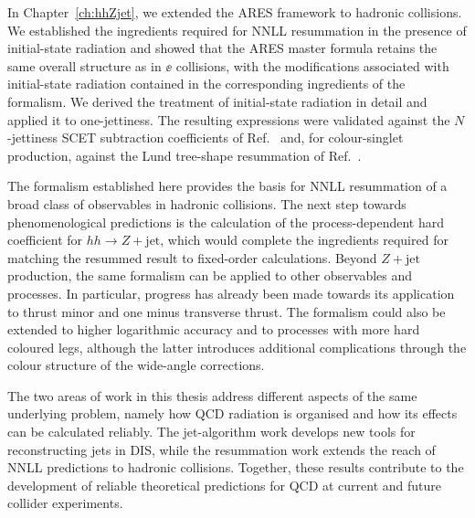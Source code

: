 In Chapter~\ref{ch:hhZjet}, we extended the \textsc{ARES}
framework to hadronic collisions. We established the ingredients required
for NNLL resummation in the presence of initial-state radiation and showed
that the \textsc{ARES} master formula retains the same overall structure
as in $\ee$ collisions, with the modifications associated with
initial-state radiation contained in the corresponding ingredients of
the formalism. We derived the treatment of initial-state radiation in detail 
and applied it to one-jettiness. The resulting expressions were validated against the 
$N$-jettiness SCET subtraction coefficients of Ref.~\cite{Gaunt:2015pea} and, for colour-singlet
production, against the Lund tree-shape resummation of Ref.~\cite{vanBeekveld:2025zjh}.

The formalism established here provides the basis for NNLL resummation of
a broad class of observables in hadronic collisions. The next step towards
phenomenological predictions is the calculation of the process-dependent
hard coefficient for $hh\to Z+\mathrm{jet}$, which would complete the
ingredients required for matching the resummed result to fixed-order
calculations. Beyond $Z+\mathrm{jet}$ production, the same formalism can be applied to
other observables and processes. In particular, progress has already been
made towards its application to thrust minor and one minus transverse
thrust. The formalism could also be extended to higher logarithmic
accuracy and to processes with more hard coloured legs, although the latter
introduces additional complications through the colour structure of the
wide-angle corrections. 

The two areas of work in this thesis address different aspects of the same
underlying problem, namely how QCD radiation is organised and how
its effects can be calculated reliably. The jet-algorithm work develops
new tools for reconstructing jets in DIS, while the resummation
work extends the reach of NNLL predictions to hadronic collisions.
Together, these results contribute
to the development of reliable theoretical predictions for QCD at current
and future collider experiments.
